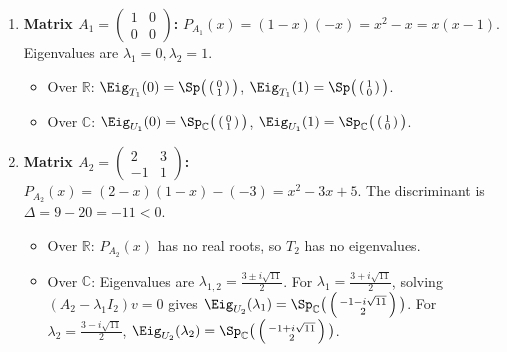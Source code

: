 \begin{exercisesolution*}
\label{sol:eigenvalues_eigenspaces_R_vs_C}
\begin{enumerate}[label=\textbf{(\alph*)}]
    \item \textbf{Matrix $A_1 = \left(\begin{smallmatrix} 1 & 0 \\ 0 & 0 \end{smallmatrix}\right)$:}
    $P_{A_1}(x) = (1-x)(-x) = x^2 - x = x(x-1)$.
    Eigenvalues are $\lambda_1 = 0, \lambda_2 = 1$.
    \begin{itemize}
        \item Over $\mathbb{R}$: $\Eig_{T_1}(0) = \Sp\big(\left(\begin{smallmatrix} 0 \\ 1 \end{smallmatrix}\right)\big)$, $\Eig_{T_1}(1) = \Sp\big(\left(\begin{smallmatrix} 1 \\ 0 \end{smallmatrix}\right)\big)$.
        \item Over $\mathbb{C}$: $\Eig_{U_1}(0) = \Sp_\mathbb{C}\big(\left(\begin{smallmatrix} 0 \\ 1 \end{smallmatrix}\right)\big)$, $\Eig_{U_1}(1) = \Sp_\mathbb{C}\big(\left(\begin{smallmatrix} 1 \\ 0 \end{smallmatrix}\right)\big)$.
    \end{itemize}

    \item \textbf{Matrix $A_2 = \left(\begin{smallmatrix} 2 & 3 \\ -1 & 1 \end{smallmatrix}\right)$:}
    $P_{A_2}(x) = (2-x)(1-x) - (-3) = x^2 - 3x + 5$.
    The discriminant is $\Delta = 9 - 20 = -11 < 0$.
    \begin{itemize}
        \item Over $\mathbb{R}$: $P_{A_2}(x)$ has no real roots, so $T_2$ has no eigenvalues.
        \item Over $\mathbb{C}$: Eigenvalues are $\lambda_{1,2} = \frac{3 \pm i\sqrt{11}}{2}$.
        For $\lambda_1 = \frac{3+i\sqrt{11}}{2}$, solving $(A_2 - \lambda_1 I_2)v = 0$ gives $\Eig_{U_2}(\lambda_1) = \Sp_\mathbb{C}\big(\left(\begin{smallmatrix} -1-i\sqrt{11} \\ 2 \end{smallmatrix}\right)\big)$.
        For $\lambda_2 = \frac{3-i\sqrt{11}}{2}$, $\Eig_{U_2}(\lambda_2) = \Sp_\mathbb{C}\big(\left(\begin{smallmatrix} -1+i\sqrt{11} \\ 2 \end{smallmatrix}\right)\big)$.
    \end{itemize}


\end{enumerate}
\end{exercisesolution*}

